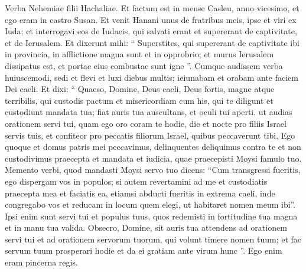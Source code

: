 \begin{biblechapter}
 \verse Verba Nehemiae filii Hachaliae. Et factum est in mense Casleu, anno vicesimo, et ego eram in castro Susan. 
\verse Et venit Hanani unus de fratribus meis, ipse et viri ex Iuda; et interrogavi eos de Iudaeis, qui salvati erant et supererant de captivitate, et de Ierusalem. 
\verse Et dixerunt mihi: “ Superstites, qui supererant de captivitate ibi in provincia, in afflictione magna sunt et in opprobrio; et murus Ierusalem dissipatus est, et portae eius combustae sunt igne ”.
 \verse Cumque audissem verba huiuscemodi, sedi et flevi et luxi diebus multis; ieiunabam et orabam ante faciem Dei caeli. 
\verse Et dixi: “ Quaeso, Domine, Deus caeli, Deus fortis, magne atque terribilis, qui custodis pactum et misericordiam cum his, qui te diligunt et custodiunt mandata tua; 
\verse fiat auris tua auscultans, et oculi tui aperti, ut audias orationem servi tui, quam ego oro coram te hodie, die et nocte pro filiis Israel servis tuis, et confiteor pro peccatis filiorum Israel, quibus peccaverunt tibi. Ego quoque et domus patris mei peccavimus, 
\verse delinquentes deliquimus contra te et non custodivimus praecepta et mandata et iudicia, quae praecepisti Moysi famulo tuo.
 \verse Memento verbi, quod mandasti Moysi servo tuo dicens: “Cum transgressi fueritis, ego dispergam vos in populos; 
\verse si autem revertamini ad me et custodiatis praecepta mea et faciatis ea, etiamsi abducti fueritis in extrema caeli, inde congregabo vos et reducam in locum quem elegi, ut habitaret nomen meum ibi”. 
\verse Ipsi enim sunt servi tui et populus tuus, quos redemisti in fortitudine tua magna et in manu tua valida.
 \verse Obsecro, Domine, sit auris tua attendens ad orationem servi tui et ad orationem servorum tuorum, qui volunt timere nomen tuum; et fac servum tuum prosperari hodie et da ei gratiam ante virum hunc ”. Ego enim eram pincerna regis.
 

\end{biblechapter}
